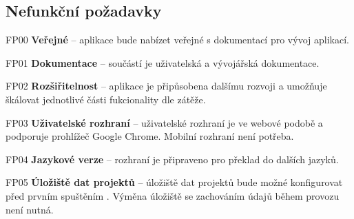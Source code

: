 \subsection{Nefunkční požadavky}\label{subsec:spec-req-common}
\begin{dl}
   \item[FP00] \textbf{Veřejné } – aplikace bude nabízet veřejné  s dokumentací pro vývoj aplikací.
   \item[FP01] \textbf{Dokumentace} – součástí  je uživatelská a vývojářská dokumentace.
   \item[FP02] \textbf{Rozšiřitelnost} – aplikace je připůsobena dalšímu rozvoji a umožňuje škálovat jednotlivé části fukcionality dle zátěže.
   \item[FP03] \textbf{Uživatelské rozhraní} – uživatelské rozhraní je ve webové podobě a podporuje prohlížeč Google Chrome.
   Mobilní rozhraní není potřeba.
   \item[FP04] \textbf{Jazykové verze} – rozhraní je připraveno pro překlad do dalších jazyků.
   \item[FP05] \textbf{Úložiště dat projektů} – úložiště dat projektů bude možné konfigurovat před prvním spuštěním .
   Výměna úložiště se zachováním údajů během provozu  není nutná.
\end{dl}





